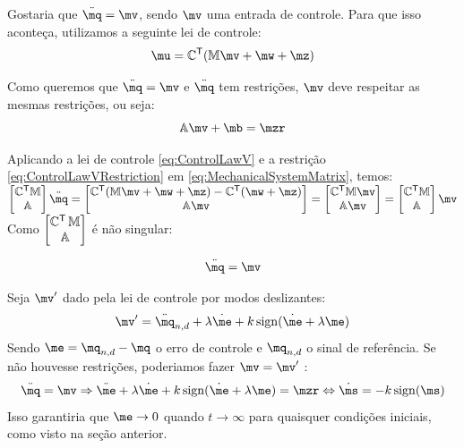 \documentclass[a4paper,11pt,brazil,fleqn]{article}
\begin{document}
Gostaria que $ \ddot{\mq} = \mv $, sendo $\mv$ uma entrada de controle. Para que isso aconte\c{c}a, utilizamos a seguinte lei de controle:
\begin{equation} \label{eq:ControlLawV}
\mu = \mC^\msT ( \mM \mv + \mw + \mz )
\end{equation}

Como queremos que $ \ddot{\mq} = \mv $ e $\ddot{\mq}$ tem restri\c{c}\~oes, $\mv$ deve respeitar as mesmas restri\c{c}\~oes, ou seja:
\begin{equation} \label{eq:ControlLawVRestriction}
\mA \mv + \mb = \mzr
\end{equation}

Aplicando a lei de controle \eqref{eq:ControlLawV} e a restri\c{c}\~ao \eqref{eq:ControlLawVRestriction} em \eqref{eq:MechanicalSystemMatrix}, temos: \\

$ \begin{bmatrix}
\mC^\msT \mM \\
\mA
\end{bmatrix}
\ddot{\mq}
=
\begin{bmatrix}
\mC^\msT ( \mM \mv + \mw + \mz ) - \mC^\msT(\mw + \mz) \\
\mA \mv
\end{bmatrix}
=
\begin{bmatrix}
\mC^\msT  \mM \mv \\
\mA \mv
\end{bmatrix}
=
\begin{bmatrix}
\mC^\msT \mM \\
\mA
\end{bmatrix}
\mv $ \\

Como $\begin{bmatrix} \mathbb{C}^{\mathsf{T}} \, \mathbb{M} \\ \mathbb{A} \end{bmatrix}$ \'e n\~ao singular:

\begin{equation} \label{eq:ClosedLoopV}
\ddot{\mq} = \mv
\end{equation}

Seja $\mv'$ dado pela lei de controle por modos deslizantes:
\begin{equation} \label{eq:SMControlowLasV1'}
\mv' = \ddot{\mq}_{n, d} + \lambda \dot{\me} + k \sign (\dot{\me} + \lambda \me)
\end{equation}
Sendo $ \me = \mq_{n,d} - \mq $ o erro de controle e $\mq_{n,d}$ o sinal de refer\^encia. Se n\~ao houvesse restri\c{c}\~oes, poderiamos fazer $ \mv = \mv' $ :
$$ \ddot{\mq} = \mv \Rightarrow  \ddot{\me} + \lambda \dot{\me} + k \sign (\dot{\me} + \lambda \me) = \mzr \Leftrightarrow \dot{\ms} = - k \sign(\ms)$$
Isso garantiria que $\me \rightarrow 0$ quando $t \rightarrow \infty$ para quaisquer condi\c{c}\~oes iniciais, como visto na se\c{c}\~ao anterior. \\
\end{document}
